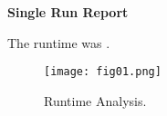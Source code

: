 \documentclass[10pt]{article}
\begin{document}
\header{}
\vskip 12pt

\begin{center}
\Large\textbf{Single Run Report}
\end{center}

The runtime was .


\begin{figure}[h]
    \centering
    \texttt{[image: fig01.png]}
    \caption{Runtime Analysis.}
\end{figure} 
\end{document}
